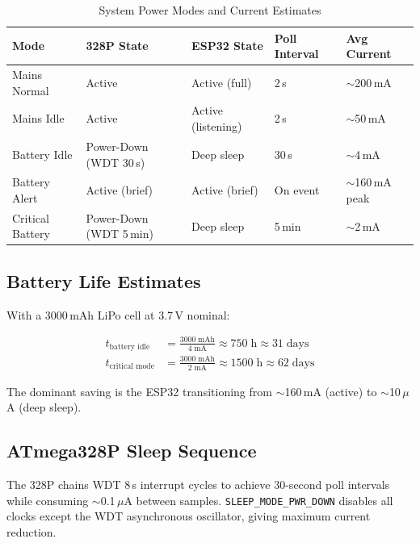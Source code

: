 \documentclass[12pt,a4paper]{article}
\begin{document}
\begin{table}[H]
\centering
\small
\begin{tabular}{@{} L{3cm} L{3.2cm} L{3.2cm} C{2.2cm} C{2cm} @{}}
\toprule
\textbf{Mode}     & \textbf{328P State}       & \textbf{ESP32 State}  & \textbf{Poll Interval} & \textbf{Avg Current} \\
\midrule
Mains Normal      & Active                    & Active (full)         & 2\,s     & $\sim$200\,mA      \\
Mains Idle        & Active                    & Active (listening)    & 2\,s     & $\sim$50\,mA       \\
Battery Idle      & Power-Down (WDT 30\,s)    & Deep sleep            & 30\,s    & $\sim$4\,mA        \\
Battery Alert     & Active (brief)            & Active (brief)        & On event & $\sim$160\,mA peak \\
Critical Battery  & Power-Down (WDT 5\,min)   & Deep sleep            & 5\,min   & $\sim$2\,mA        \\
\bottomrule
\end{tabular}
\caption{System Power Modes and Current Estimates}
\end{table}

\subsection{Battery Life Estimates}

With a 3000\,mAh LiPo cell at 3.7\,V nominal:

\begin{align}
t_{\text{battery idle}}  &= \frac{3000\;\text{mAh}}{4\;\text{mA}}
                           \approx 750\;\text{h} \approx 31\;\text{days} \\[6pt]
t_{\text{critical mode}} &= \frac{3000\;\text{mAh}}{2\;\text{mA}}
                           \approx 1500\;\text{h} \approx 62\;\text{days}
\end{align}

\noindent The dominant saving is the ESP32 transitioning from
$\sim$160\,mA (active) to $\sim$10\,$\mu$A (deep sleep).

\subsection{ATmega328P Sleep Sequence}

The 328P chains WDT 8\,s interrupt cycles to achieve 30-second poll
intervals while consuming $\sim$0.1\,$\mu$A between samples.
\texttt{SLEEP\_MODE\_PWR\_DOWN} disables all clocks except the WDT
asynchronous oscillator, giving maximum current reduction.
\end{document}
